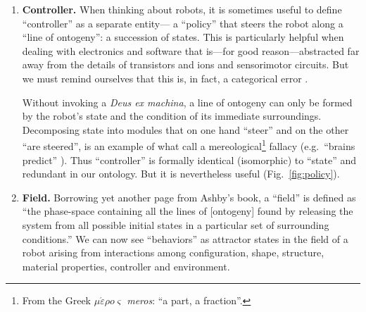 \begin{enumerate}
    
    \item \textbf{Controller.}
    When thinking about robots, it is sometimes useful to define ``controller'' as a separate entity---%
    a ``policy'' \cite{sutton2018reinforcement}
    that steers the robot along a ``line of ontogeny'': a succession of states.
    This is particularly helpful when dealing with electronics and software that is---for good reason---abstracted far away from the details of transistors and ions and sensorimotor circuits.
    But we must remind ourselves that this is, in fact, a categorical error \cite{dreyfus1967computers,harvey2000robotics,pfeifer2006body}.
    
    Without invoking a \textit{Deus ex machina}, a line of ontogeny can only be formed by the robot's state and the condition of its immediate surroundings.
    Decomposing state into modules that on one hand ``steer'' and on the other ``are steered'', is an example of what \citet{bennett2003philosophical} call a mereological\footnote{%
    From the Greek $\mu\acute{\varepsilon}\rho{o}\varsigma$ %
    \textit{meros}: ``a part, a fraction''.
    } 
    fallacy (e.g.~``brains predict'' \cite{clark2013whatever}).
    Thus ``controller'' is formally identical (isomorphic) to ``state'' and redundant in our ontology.
    But it is nevertheless
    useful (Fig.~\ref{fig:policy}).
    
    
    \item \textbf{Field.}
    Borrowing yet another page from Ashby's book, a ``field'' is defined as ``the phase-space containing all the lines of 
    [ontogeny] 
    found by releasing the system from all possible initial states in a particular set of surrounding conditions.''
    We can now see ``behaviors'' as attractor states in the field of a robot arising from interactions among configuration, shape, structure, material properties, 
    controller 
    and environment.


\end{enumerate}
